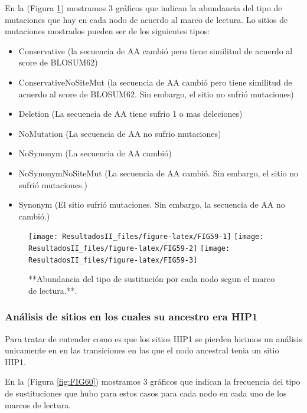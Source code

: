 \documentclass[
]{book}
\providecommand{\tightlist}{%
  \setlength{\itemsep}{0pt}\setlength{\parskip}{0pt}}
\begin{document}
En la (Figura \ref{fig:FIG59}) mostramos 3 gráficos que indican la abundancia del tipo de mutaciones que hay en cada nodo de acuerdo al marco de lectura. Lo sitios de mutaciones mostrados pueden ser de los siguientes tipos:

\begin{itemize}
\tightlist
\item
  Conservative (la secuencia de AA cambió pero tiene similitud de acuerdo al score de BLOSUM62)
\item
  ConservativeNoSiteMut (la secuencia de AA cambió pero tiene similitud de acuerdo al score de BLOSUM62. Sin embargo, el sitio no sufrió mutaciones)
\item
  Deletion (La secuencia de AA tiene sufrio 1 o mas deleciones)
\item
  NoMutation (La secuencia de AA no sufrio mutaciones)
\item
  NoSynonym (La secuencia de AA cambió)
\item
  NoSynonymNoSiteMut (La secuencia de AA cambió. Sin embargo, el sitio no sufrió mutaciones.)
\item
  Synonym (El sitio sufrió mutaciones. Sin embargo, la secuencia de AA no cambió.)
\end{itemize}

\begin{figure}

{\centering \texttt{[image: ResultadosII\_files/figure-latex/FIG59-1]} \texttt{[image: ResultadosII\_files/figure-latex/FIG59-2]} \texttt{[image: ResultadosII\_files/figure-latex/FIG59-3]} 

}

\caption{**Abundancia del tipo de sustitución por cada nodo segun el marco de lectura.**.}\label{fig:FIG59}
\end{figure}

\hypertarget{anuxe1lisis-de-sitios-en-los-cuales-su-ancestro-era-hip1-2}{%
\subsubsection{Análisis de sitios en los cuales su ancestro era HIP1}\label{anuxe1lisis-de-sitios-en-los-cuales-su-ancestro-era-hip1-2}}

Para tratar de entender como es que los sitios HIP1 se pierden hicimos un análisis unicamente en en las transiciones en las que el nodo ancestral tenia un sitio HIP1.

En la (Figura \ref{fig:FIG60}) mostramos 3 gráficos que indican la frecuencia del tipo de sustituciones que hubo para estos casos para cada nodo en cada uno de los marcos de lectura.
\end{document}
